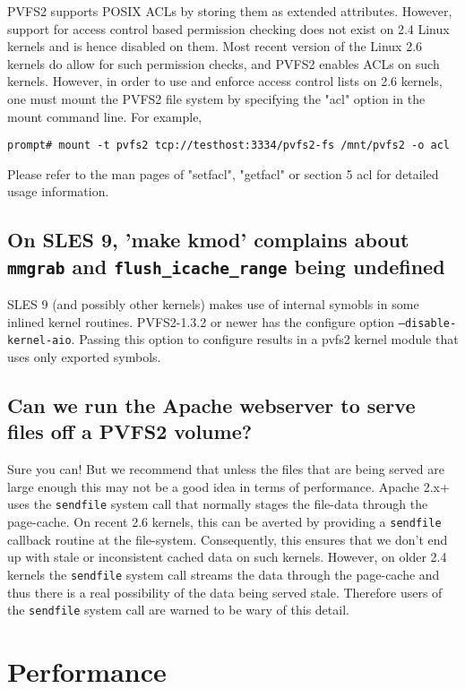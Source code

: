 \documentclass[11pt,letterpaper]{article}
\begin{document}
PVFS2 supports POSIX ACLs by storing them as extended attributes. However, support
for access control based permission checking does not exist on 2.4 Linux kernels and is hence disabled on them.
Most recent version of the Linux 2.6 kernels do allow for such permission checks, and PVFS2 enables
ACLs on such kernels.
However, in order to use and enforce access control lists on 2.6 kernels, one must mount
the PVFS2 file system by specifying the "acl" option in the mount command line. For example,
\begin{verbatim}
prompt# mount -t pvfs2 tcp://testhost:3334/pvfs2-fs /mnt/pvfs2 -o acl
\end{verbatim}
Please refer to the man pages of "setfacl", "getfacl" or section 5 acl for detailed usage
information.

\subsection{On SLES 9, 'make kmod' complains about \texttt{mmgrab} and
 \texttt{flush\_icache\_range} being undefined}

SLES 9 (and possibly other kernels) makes use of internal symobls in some
inlined kernel routines.  PVFS2-1.3.2 or newer has the configure option
\texttt{--disable-kernel-aio}.  Passing this option to configure results in a pvfs2
kernel module that uses only exported symbols.  

\subsection{Can we run the Apache webserver to serve files off a PVFS2 volume?}

Sure you can! But we recommend that unless the files that are being served are large enough
this may not be a good idea in terms of performance. Apache 2.x+ uses the {\tt sendfile}
system call that normally stages the file-data through the page-cache. On recent 2.6 kernels,
this can be averted by providing a {\tt sendfile} callback routine at the file-system.
Consequently, this ensures that we don't end up with stale or inconsistent cached data on such
kernels. However, on older 2.4 kernels the {\tt sendfile} system call streams the data through
the page-cache and thus there is a real possibility of the data being served stale.
Therefore users of the {\tt sendfile} system call are warned to be wary of this detail.

%
%
\section{Performance}
\end{document}
